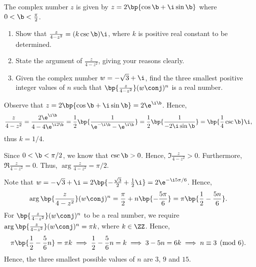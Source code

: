 \begin{problem}
    The complex number $z$ is given by $z = 2\bp{\cos\b + \i\sin\b}$ where $0 < \b < \frac\pi2$.

    \begin{enumerate}
        \item Show that $\frac{z}{4 - z^2} = (k\csc\b)\i$, where $k$ is positive real constant to be determined.
        \item State the argument of $\frac{z}{4 - z^2}$, giving your reasons clearly.
        \item Given the complex number $w = -\sqrt3 + \i$, find the three smallest positive integer values of $n$ such that $\bp{\frac{z}{4 - z^2}}(w\conj)^n$ is a real number.
    \end{enumerate}
\end{problem}
\begin{solution}
    \begin{ppart}
        Observe that $z = 2\bp{\cos\b + \i\sin\b} = 2\e^{\i\b}$. Hence, \[\frac{z}{4 - z^2} = \frac{2\e^{\i\b}}{4 - 4\e^{\i2\b}} = \frac12\bp{\frac{1}{\e^{-\i\b} - \e^{\i\b}}} = \frac12\bp{\frac1{-2\i\sin\b}} = \bp{\frac14 \csc \b} \i,\] thus $k = 1/4$.
    \end{ppart}
    \begin{ppart}
        Since $0 < \b < \pi/2$, we know that $\csc \b > 0$. Hence, $\Im{\frac{z}{4 - z^2}} > 0$. Furthermore, $\Re{\frac{z}{4 - z^2}} = 0$. Thus, $\arg{\frac{z}{4 - z^2}} = \pi/2$.
    \end{ppart}
    \begin{ppart}
        Note that $w = -\sqrt3 + \i = 2\bp{-\frac{\sqrt3}2 + \frac12 \i} = 2\e^{-\i5\pi/6}$. Hence, \[            \arg{\bp{\frac{z}{4 - z^2}}(w\conj)^n} = \frac\pi2 + n\bp{-\frac{5\pi}6} = \pi\bp{\frac12 - \frac{5n}{6}}.\]
        For $\bp{\frac{z}{4 - z^2}}(w\conj)^n$ to be a real number, we require $\arg{\bp{\frac{z}{4 - z^2}}(w\conj)^n} = \pi k$, where $k \in \ZZ$. Hence, \[\pi\bp{\frac12 - \frac56 n} = \pi k \implies  \frac12 - \frac56 n = k \implies 3 - 5n = 6k \implies n \equiv 3 \pmod{6}.\] Hence, the three smallest possible values of $n$ are $3$, $9$ and $15$.
    \end{ppart}
\end{solution}